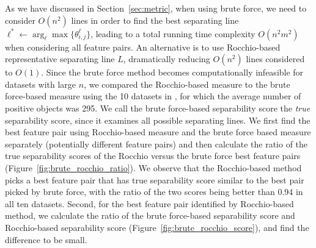  As we have discussed in Section~\ref{sec:metric}, when using brute force, we need to consider $O(n^2)$ lines in order to find the best separating line $\ell^* \leftarrow \arg_\ell \max \{\theta_{i,j}^{\ell}\}$, leading to a total running time complexity $O(n^2m^2)$ when considering all feature pairs. An alternative is to use Rocchio-based representative separating line $L$, dramatically reducing $O(n^2)$ lines considered to $O(1)$. Since the brute force method becomes computationally infeasible for datasets with large $n$, we compared the Rocchio-based measure to the brute force-based measure using
the 10 datasets in \msig, for which the average number of positive objects was 295.
 
We call the brute force-based separability score the {\em true} separability score, since it examines all possible separating lines. We first find the best feature pair using Rocchio-based measure and the brute force based measure separately (potentially different feature pairs) and then calculate the ratio of the true separability scores of the Rocchio versus the brute force best feature pairs (Figure~\ref{fig:brute_rocchio_ratio}). We observe that the Rocchio-based method picks a best feature pair that has true separability score similar to the best pair picked by brute force, with the ratio of the two scores being better than 0.94 in all ten datasets. Second, for the best feature pair identified by Rocchio-based method, we calculate the ratio of the brute force-based separability score and Rocchio-based separability score (Figure~\ref{fig:brute_rocchio_score}), and find the difference to be small.

